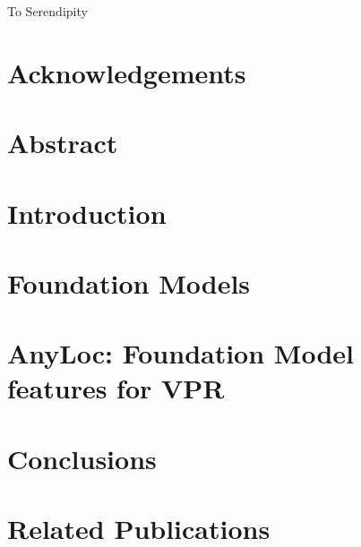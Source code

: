 







\newpage
\thispagestyle{empty}
\vspace*{\fill}
\begin{center}
    {\large
        To Serendipity
    }
\end{center}
\vspace*{\fill}

\chapter*{Acknowledgements}
\label{ch:ack}


\chapter*{Abstract}
\label{ch:abstract}


\tableofcontents
\listoffigures
\listoftables
\ifdraftmode
\fi
\startDocument

\chapter{Introduction}
\label{ch:intro}


\chapter{Foundation Models}
\label{ch:foundation-models}


\chapter{AnyLoc: Foundation Model features for VPR}
\label{ch:anyloc}


\chapter{Conclusions}
\label{ch:conc}


\chapter*{Related Publications}
\label{ch:relatedPubs}


\printbibliography[heading=bibintoc]


